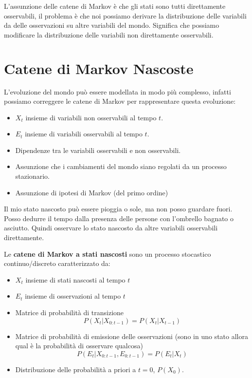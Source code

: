 L'assunzione delle catene di Markov è che gli stati sono tutti direttamente osservabili,
il problema è che noi possiamo derivare la distribuzione delle variabili da delle
osservazioni su altre variabili del mondo. Significa che possiamo modificare la
distribuzione delle variabili non direttamente osservabili.
\section{Catene di Markov Nascoste}
L'evoluzione del mondo può essere modellata in modo più complesso, infatti possiamo
correggere le catene di Markov per rappresentare questa evoluzione:
\begin{itemize}
    \item $X_t$ insieme di variabili non osservabili al tempo $t$.
    \item $E_t$ insieme di variabili osservabili al tempo $t$.
    \item Dipendenze tra le variabili osservabili e non osservabili.
    \item Assunzione che i cambiamenti del mondo siano regolati da un processo
          stazionario.
    \item Assunzione di ipotesi di Markov (del primo ordine)
\end{itemize}
\begin{esempio}
    Il mio stato nascosto può essere pioggia o sole, ma non posso guardare fuori.
    Posso dedurre il tempo dalla presenza delle persone con l'ombrello bagnato o
    asciutto. Quindi osservare lo stato nascosto da altre variabili osservabili
    direttamente.
\end{esempio}
\begin{definizione}
    Le \textbf{catene di Markov a stati nascosti} sono un processo stocastico
    continuo/discreto caratterizzato da:
    \begin{itemize}
        \item $X_t$ insieme di stati nascosti al tempo $t$
        \item $E_t$ insieme di osservazioni al tempo $t$
        \item Matrice di probabilità di transizione
              \begin{equation*}
                  P(X_t | X_{0:t-1}) = P(X_t | X_{t-1})
              \end{equation*}
        \item Matrice di probabilità di emissione delle osservazioni (sono in uno
              stato allora qual è la probabilità di osservare qualcosa)
              \begin{equation*}
                  P(E_t | X_{0:t-1}, E_{0:t-1}) = P(E_t | X_{t})
              \end{equation*}
        \item Distribuzione delle probabilità a priori a $t=0$, $P(X_0)$.
    \end{itemize}
\end{definizione}
